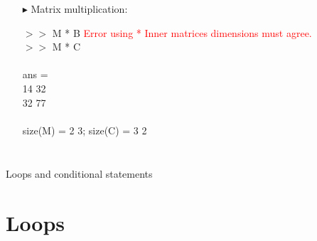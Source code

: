 \documentclass[xcolor={dvipsnames,rgb}, aspectratio=169]{beamer}
\begin{document}
\begin{frame}{}
\begin{columns}
        \vspace{-10pt}
        \begin{itemize}
            \item[$\blacktriangleright$] Matrix multiplication:
                  \begin{tcolorbox}[colback=white,colframe=bluepoli]
                      $>>$ M * B
                      \tcblower
                      \textcolor{red}{\small{Error using * Inner matrices dimensions must agree.}}
                      \DrawLine \\
                      $>>$ M * C \\
                      \DrawLine \\
                      ans = \\
                      14 \hspace{3em}32 \\
                      32 \hspace{3em}77 \\
                      \DrawLine \\
                      \textcolor{codegreen}{size(M) = 2 3; size(C) =  3 2}
                  \end{tcolorbox}
        \end{itemize}
    \end{columns}
\end{frame}

{
\begin{frame}[standout]
    Loops and conditional statements
\end{frame}
}

\section{Loops}
\end{document}
